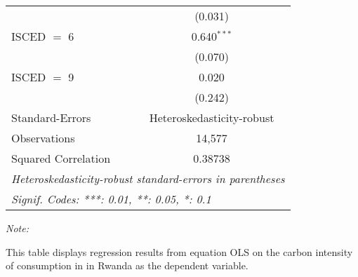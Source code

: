 \begin{table}[htbp!]
\begin{adjustbox}{width = 1\textwidth, max height = 0.95\textheight, center}
\begin{threeparttable}[b]
\begin{tabular}{lc}
                                & (0.031)\\   
            ISCED $=$ 6         & 0.640$^{***}$\\   
                                & (0.070)\\   
            ISCED $=$ 9         & 0.020\\   
                                & (0.242)\\   
            \midrule 
            Standard-Errors     & Heteroskedasticity-robust \\   
            Observations        & 14,577\\  
            Squared Correlation & 0.38738\\  
            \midrule \midrule
            \multicolumn{2}{l}{\emph{Heteroskedasticity-robust standard-errors in parentheses}}\\
            \multicolumn{2}{l}{\emph{Signif. Codes: ***: 0.01, **: 0.05, *: 0.1}}\\
         \end{tabular}
         
         \begin{tablenotes}\item \medskip \textit{Note:}
            \item This table displays regression results from equation OLS on the carbon intensity of consumption in  in Rwanda as the dependent variable. 
         \end{tablenotes}
      \end{threeparttable}
   \end{adjustbox}
\end{table}


